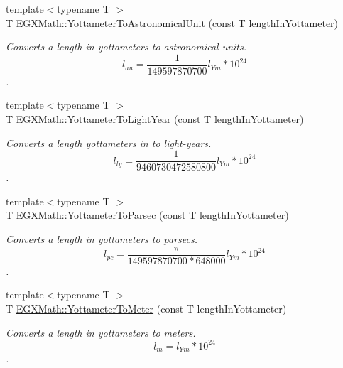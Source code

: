 \begin{DoxyCompactItemize}
\item 
{\footnotesize template$<$typename T $>$ }\\T \mbox{\hyperlink{group___e_g_x_math-_conversions-_length_conversions-_s_i-_yottameter-_astronomical_gab75681ecd108900ae547e58495a62dd3}{E\+G\+X\+Math\+::\+Yottameter\+To\+Astronomical\+Unit}} (const T length\+In\+Yottameter)
\begin{DoxyCompactList}\small\item\em Converts a length in yottameters to astronomical units. \[ l_{au}= \frac{1}{149597870700} l_{Ym} * 10^{24} \]. \end{DoxyCompactList}\item 
{\footnotesize template$<$typename T $>$ }\\T \mbox{\hyperlink{group___e_g_x_math-_conversions-_length_conversions-_s_i-_yottameter-_astronomical_ga0ab87688c8dea9fb838a3bca34cba82c}{E\+G\+X\+Math\+::\+Yottameter\+To\+Light\+Year}} (const T length\+In\+Yottameter)
\begin{DoxyCompactList}\small\item\em Converts a length yottameters in to light-\/years. \[ l_{ly}= \frac{1}{9460730472580800} l_{Ym} * 10^{24} \]. \end{DoxyCompactList}\item 
{\footnotesize template$<$typename T $>$ }\\T \mbox{\hyperlink{group___e_g_x_math-_conversions-_length_conversions-_s_i-_yottameter-_astronomical_gadcada2ea03efbd6c010a780b87daf01f}{E\+G\+X\+Math\+::\+Yottameter\+To\+Parsec}} (const T length\+In\+Yottameter)
\begin{DoxyCompactList}\small\item\em Converts a length in yottameters to parsecs. \[ l_{pc}=\frac{\pi}{149597870700 * 648000} l_{Ym} * 10^{24} \]. \end{DoxyCompactList}\item 
{\footnotesize template$<$typename T $>$ }\\T \mbox{\hyperlink{group___e_g_x_math-_conversions-_length_conversions-_s_i-_yottameter-_s_i_ga01c4f2e699cc2b062bdd2e81073a7ef2}{E\+G\+X\+Math\+::\+Yottameter\+To\+Meter}} (const T length\+In\+Yottameter)
\begin{DoxyCompactList}\small\item\em Converts a length in yottameters to meters. \[ l_{m}=l_{Ym} * 10^{24} \]. \end{DoxyCompactList}\item 

\end{DoxyCompactItemize}
